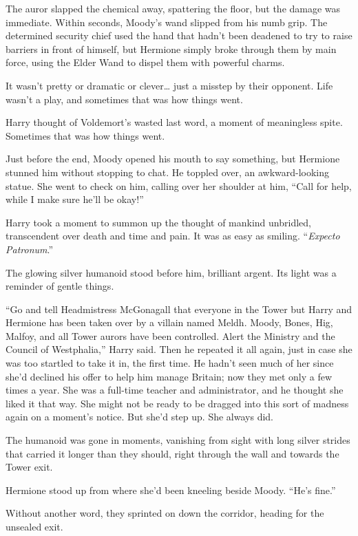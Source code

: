 The auror slapped the chemical away, spattering the floor, but the
damage was immediate. Within seconds, Moody's wand slipped from his numb
grip. The determined security chief used the hand that hadn't been
deadened to try to raise barriers in front of himself, but Hermione
simply broke through them by main force, using the Elder Wand to dispel
them with powerful charms.

It wasn't pretty or dramatic or clever\ldots{} just a misstep by their
opponent. Life wasn't a play, and sometimes that was how things went.

Harry thought of Voldemort's wasted last word, a moment of meaningless
spite. Sometimes that was how things went.

Just before the end, Moody opened his mouth to say something, but
Hermione stunned him without stopping to chat. He toppled over, an
awkward-looking statue. She went to check on him, calling over her
shoulder at him, ``Call for help, while I make sure he'll be okay!''

Harry took a moment to summon up the thought of mankind unbridled,
transcendent over death and time and pain. It was as easy as smiling.
``\emph{Expecto Patronum}.''

The glowing silver humanoid stood before him, brilliant argent. Its
light was a reminder of gentle things.

``Go and tell Headmistress McGonagall that everyone in the Tower but
Harry and Hermione has been taken over by a villain named Meldh. Moody,
Bones, Hig, Malfoy, and all Tower aurors have been controlled. Alert the
Ministry and the Council of Westphalia,'' Harry said. Then he repeated
it all again, just in case she was too startled to take it in, the first
time. He hadn't seen much of her since she'd declined his offer to help
him manage Britain; now they met only a few times a year. She was a
full-time teacher and administrator, and he thought she liked it that
way. She might not be ready to be dragged into this sort of madness
again on a moment's notice. But she'd step up. She always did.

The humanoid was gone in moments, vanishing from sight with long silver
strides that carried it longer than they should, right through the wall
and towards the Tower exit.

Hermione stood up from where she'd been kneeling beside Moody. ``He's
fine.''

Without another word, they sprinted on down the corridor, heading for
the unsealed exit.

